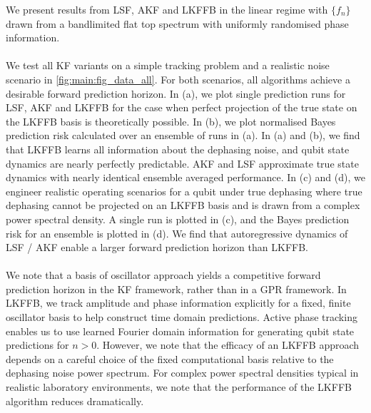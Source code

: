 We present results from LSF, AKF and LKFFB in the linear regime with $\{ f_n \}$ drawn from a bandlimited flat top spectrum with uniformly randomised phase information.
\\
\\
We test all KF variants on a simple tracking problem and a realistic noise scenario in \cref{fig:main:fig_data_all}. For both scenarios, all algorithms achieve a desirable forward prediction horizon. In (a), we plot single prediction runs for LSF, AKF and LKFFB for the case when perfect projection of the true state on the LKFFB basis is theoretically possible. In (b), we plot normalised Bayes prediction risk calculated over an ensemble of runs in (a).  In (a) and (b), we find that LKFFB learns all information about the dephasing noise, and qubit state dynamics are nearly perfectly predictable. AKF and LSF approximate true state dynamics with nearly identical ensemble averaged performance.  In (c) and (d), we engineer realistic operating scenarios for a qubit under true dephasing where true dephasing cannot be projected on an LKFFB basis and is drawn from a complex power spectral density. A single run is plotted in (c), and the Bayes prediction risk for an ensemble is plotted in (d). We find that autoregressive dynamics of LSF / AKF enable a larger forward prediction horizon than LKFFB.
\\
\\
We note that a basis of oscillator approach yields a competitive forward prediction horizon in the KF framework, rather than in a GPR framework. In LKFFB, we track amplitude and phase information explicitly for a fixed, finite oscillator basis to help construct time domain predictions. Active phase tracking enables us to use learned Fourier domain information for generating qubit state predictions for $n>0$. However, we note that the efficacy of an LKFFB approach depends on a careful choice of the fixed computational basis relative to the dephasing noise power spectrum. For complex power spectral densities typical in realistic laboratory environments, we note that the performance of the LKFFB algorithm reduces dramatically. 
\\
\\
